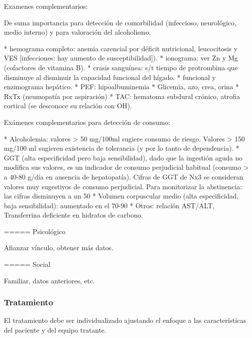 \documentclass[encares.tex]{subfiles}
\begin{document}
Examenes complementarios:

De suma importancia para detección de comorbilidad (infeccioso, neurológico, medio interno) y para valoración del alcoholismo.

* hemograma completo: anemia carencial por déficit nutricional, leucocitosis y VES [infecciones: hay aumento de susceptibilidad]).
* ionograma: ver Zn y Mg (cofactores de vitamina B).
* crasis sanguínea: s/t tiempo de protrombina que disminuye al disminuir la capacidad funcional del hígado.
* funcional y enzimograma hepático.
* PEF: hipoalbuminemia
* Glicemia, azo, crea, orina
* RxTx (neumopatía por aspiración)
* TAC: hematoma subdural crónico, atrofia cortical (se desconoce su relación con OH).

Exámenes complementarios para detección de consumo:

* Alcoholemia: valores > 50 mg/100ml sugiere consumo de riesgo. Valores > 150 mg/100 ml sugieren existencia de tolerancia (y por lo tanto de dependencia).
* GGT (alta especificidad pero baja sensibilidad), dado que la ingestión aguda no modifica sus valores, es un indicador de consumo perjudicial habitual (consumo > a 40-80 g/día en ausencia de hepatopatía). Cifras de GGT de Nx3 se consideran valores muy sugestivos de consumo perjudicial. Para monitorizar la abstinencia: las cifras disminuyen a un 50%
* Volumen corpuscular medio (alta especificidad, baja sensibilidad): aumentado en el 70-90%
* Otros: relación AST/ALT, Transferrina deficiente en hidratos de carbono.

===== Psicológico

Afianzar vínculo, obtener más datos.

===== Social

Familiar, datos anteriores, etc.

\subsubsection*{Tratamiento}

El tratamiento debe ser individualizado ajustando el enfoque a las características del paciente y del equipo tratante.
\end{document}
